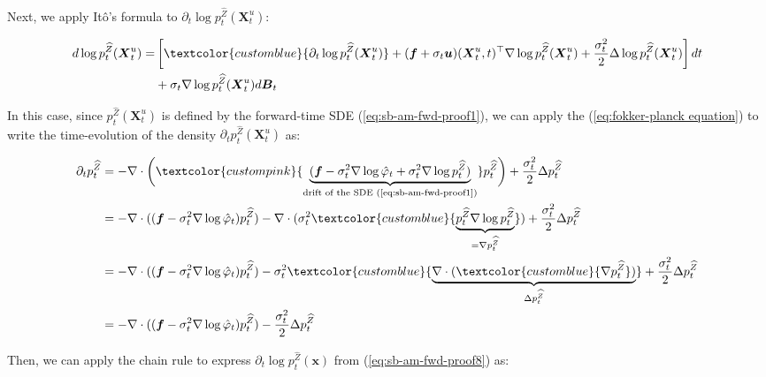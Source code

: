 \documentclass{article}
\newcommand{\bluetext}[1]{\textcolor{customblue}{#1}}
\newcommand{\pinktext}[1]{\textcolor{custompink}{#1}}
\begin{document}
Next, we apply Itô's formula to $\partial_t\log p_t^{\widehat{Z}}(\boldsymbol{X}_t^u)$:
\begin{small}
\begin{align}
    d\log p_t^{\widehat{Z}}(\boldsymbol{X}_t^u)=&\left[\bluetext{\partial_t\log p_t^{\widehat{Z}}(\boldsymbol{X}_t^u)}+(\boldsymbol{f}+\sigma_t\boldsymbol{u})(\boldsymbol{X}_t^u,t)^\top \nabla \log p_t^{\widehat{Z}}(\boldsymbol{X}_t^u)+\frac{\sigma^2_t}{2}\Delta \log p_t^{\widehat{Z}}(\boldsymbol{X}_t^u)\right]dt\nonumber\\
    &+\sigma_t\nabla \log p_t^{\widehat{Z}}(\boldsymbol{X}_t^u)d\boldsymbol{B}_t\label{eq:sb-am-fwd-proof7}
\end{align}
\end{small}
In this case, since $p_t^{\widehat{Z}}(\boldsymbol{X}_t^u)$ is defined by the forward-time SDE (\ref{eq:sb-am-fwd-proof1}), we can apply the (\ref{eq:fokker-planck equation}) to write the time-evolution of the density $\partial_t p_t^{\widehat{Z}}(\boldsymbol{X}_t^u)$ as: 
\begin{small}
\begin{align}
    \partial_tp_t^{\widehat{Z}}&=-\nabla\cdot \bigg(\pinktext{\underbrace{(\boldsymbol{f}-\sigma^2_t\nabla\log\hat\varphi_t+ \sigma_t^2\nabla\log p_t^{\widehat{Z}})}_{\text{drift of the SDE (\ref{eq:sb-am-fwd-proof1})}}}p_t^{\widehat{Z}}\bigg)+\frac{\sigma_t^2}{2}\Delta p_t^{\widehat{Z}}\nonumber\\
    &=-\nabla\cdot ((\boldsymbol{f}-\sigma^2_t\nabla\log\hat\varphi_t)p_t^{\widehat{Z}})-\nabla \cdot (\sigma_t^2\bluetext{\underbrace{p_t^{\widehat{Z}}\nabla\log p_t^{\widehat{Z}}}_{=\nabla p_t^{\widehat{Z}} }})+\frac{\sigma_t^2}{2}\Delta p_t^{\widehat{Z}}\nonumber\\
    &=-\nabla\cdot ((\boldsymbol{f}-\sigma^2_t\nabla\log\hat\varphi_t)p_t^{\widehat{Z}})- \sigma_t^2\bluetext{\underbrace{\nabla \cdot (\bluetext{\nabla p_t^{\widehat{Z}}})}_{\Delta p_t^{\widehat{Z}}}}+\frac{\sigma_t^2}{2}\Delta p_t^{\widehat{Z}}\nonumber\\
    &=-\nabla\cdot ((\boldsymbol{f}-\sigma^2_t\nabla\log\hat\varphi_t)p_t^{\widehat{Z}})- \frac{\sigma_t^2}{2}\Delta p_t^{\widehat{Z}}\label{eq:sb-am-fwd-proof8}
\end{align}
\end{small}
Then, we can apply the chain rule to express $\partial_t\log p_t^{\widehat{Z}}(\boldsymbol{x})$ from (\ref{eq:sb-am-fwd-proof8}) as: 
\end{document}
